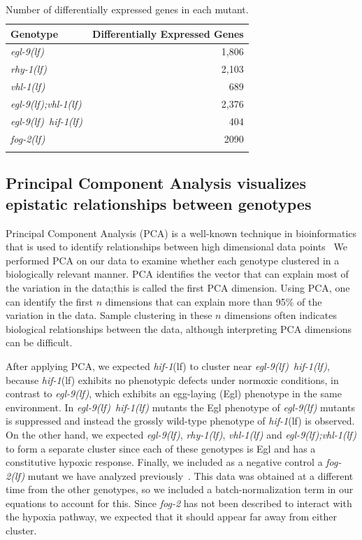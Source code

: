 \documentclass[10pt, onecolumn]{article}
\newcommand{\gene}[1]{\emph{#1}}
\newcommand{\fog}{\emph{\mbox{fog-2(lf)}}}
\newcommand{\egl}{\emph{\mbox{egl-9}(lf)}}
\newcommand{\rhy}{\emph{\mbox{rhy-1}(lf)}}
\newcommand{\vhl}{\emph{\mbox{vhl-1}(lf)}}
\newcommand{\eglvhl}{\emph{\mbox{egl-9(lf);vhl-1(lf)}}}
\newcommand{\eglhif}{\emph{\mbox{egl-9(lf)}~\mbox{hif-1(lf)}}}
\newcommand{\hif}{\emph{\mbox{hif-1}}(lf)}
\newcommand{\egln}{1,806}
\newcommand{\rhyn}{2,103}
\newcommand{\vhln}{689}
\newcommand{\eglvhln}{2,376}
\newcommand{\eglhifn}{404}
\newcommand{\fogn}{2090}
\begin{document}
\begin{table}[tbhp]
  \centering
  \begin{tabular}{lr}
    \toprule{}
    Genotype & Differentially Expressed Genes \\
    \midrule{}
    \egl{} & \egln{}\\
    \rhy{} & \rhyn{}\\
    \vhl{} & \vhln{}\\
    \eglvhl{} & \eglvhln{}\\
    \eglhif{} & \eglhifn{}\\
    \fog{} & \fogn{}\\
    \bottomrule{}
  \end{tabular}
  \caption{Number of differentially expressed genes in each mutant.}
\label{tab:genes}
\end{table}

\subsection*{Principal Component Analysis visualizes epistatic relationships between genotypes}
\label{sub:Clustering}

Principal Component Analysis (PCA) is a well-known technique in bioinformatics that is
used to identify relationships between high dimensional data points~\cite{Yeung2001}
We performed PCA on our data to examine whether each genotype clustered in a biologically
relevant manner. PCA identifies the vector that can explain most of the variation
in the data;this is called the first PCA dimension. Using PCA, one can identify
the first $n$ dimensions that can explain more than 95\% of the variation in the
data. Sample clustering in these $n$ dimensions often indicates biological
relationships between the data, although interpreting PCA dimensions can be
difficult.

After applying PCA, we expected \hif{} to cluster near \eglhif{}, because
\hif{} exhibits no phenotypic defects under normoxic conditions, in contrast to
\egl{}, which exhibits an egg-laying (Egl) phenotype in the same environment.
In \eglhif{} mutants the Egl phenotype of \egl{} mutants is suppressed and instead
the grossly wild-type phenotype of \hif{} is observed. On the other hand, we
expected \egl{}, \rhy{}, \vhl{} and \eglvhl{} to form a separate cluster since
each of these genotypes is Egl and has a constitutive hypoxic response. Finally,
we included as a negative control a \fog{} mutant we have analyzed
previously~\cite{Angeles-Albores2016a}. This data was obtained at a different
time from the other genotypes, so we included a batch-normalization term in our
equations to account for this. Since \gene{fog-2} has not been described
to interact with the hypoxia pathway, we expected that it should appear far away
from either cluster.
\end{document}
